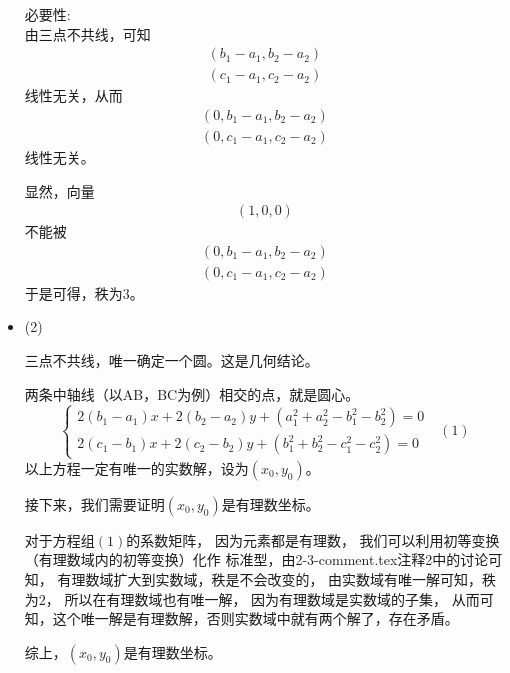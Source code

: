 \documentclass{article}
\begin{document}
\begin{itemize}
        必要性: \\
        由三点不共线，可知
        \begin{align*}
          (b_1 - a_1, b_2 - a_2) \\
          (c_1 - a_1, c_2 - a_2)
        \end{align*}
        线性无关，从而
        \begin{align*}
          (0, b_1 - a_1, b_2 - a_2) \\
          (0, c_1 - a_1, c_2 - a_2)
        \end{align*}
        线性无关。

        显然，向量
        \begin{align*}
          (1, 0, 0)
        \end{align*}
        不能被
        \begin{align*}
          (0, b_1 - a_1, b_2 - a_2) \\
          (0, c_1 - a_1, c_2 - a_2)
        \end{align*}
        于是可得，秩为$3$。

  \item (2)

        三点不共线，唯一确定一个圆。这是几何结论。

        两条中轴线（以AB，BC为例）相交的点，就是圆心。
        \begin{equation*}
          \begin{cases*}
            2(b_1 - a_1)x + 2(b_2 - a_2)y + (a_1^2 + a_2^2 - b_1^2 - b_2^2) = 0 \\
            2(c_1 - b_1)x + 2(c_2 - b_2)y + (b_1^2 + b_2^2 - c_1^2 - c_2^2) = 0
          \end{cases*}
          \ \ \ (1)
        \end{equation*}
        以上方程一定有唯一的实数解，设为$(x_0, y_0)$。

        接下来，我们需要证明$(x_0, y_0)$是有理数坐标。

        对于方程组$(1)$的系数矩阵，
        因为元素都是有理数，
        我们可以利用初等变换（有理数域内的初等变换）化作
        标准型，由2-3-comment.tex注释2中的讨论可知，
        有理数域扩大到实数域，秩是不会改变的，
        由实数域有唯一解可知，秩为$2$，
        所以在有理数域也有唯一解，
        因为有理数域是实数域的子集，
        从而可知，这个唯一解是有理数解，否则实数域中就有两个解了，存在矛盾。

        综上，$(x_0, y_0)$是有理数坐标。
\end{itemize}
\end{document}
